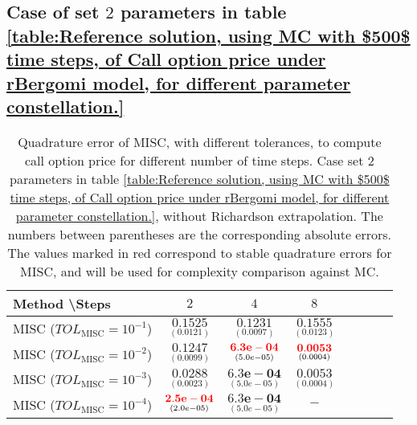 \subsection{Case of set $2$ parameters in table \ref{table:Reference solution, using MC with $500$ time steps, of Call option price under rBergomi model, for different parameter constellation.} }
\label{appendix:Case of set $2$ parameters_linear}



\begin{table}[h!]
	\centering
	\begin{tabular}{l*{6}{c}r}
		Method \textbackslash  Steps            & $2$ & $4$ & $8$ \\
		\hline
		MISC ($TOL_{\text{MISC}}=10^{-1}$)  & $\underset{(     0.0121)}{\mathbf{
				0.1525}}$ & $\underset{(    0.0097)}{\mathbf{      0.1231
		}}$ & $\underset{( 0.0123
			
			)}{\mathbf{    0.1555}}$   \\
		MISC ($TOL_{\text{MISC}}=10^{-2}$)  & $\underset{(    0.0099
			)}{\mathbf{     0.1247
		}}$ & $\underset{(   5.0e-05)}{\mathbf{\red{  6.3e-04}
		}}$ & $\underset{(0.0004)}{\mathbf{\red{0.0053}}}$  \\
		MISC ($TOL_{\text{MISC}}=10^{-3}$)        & $\underset{(    
			0.0023)}{\mathbf{0.0288}}$  &$\underset{(   5.0e-05)}{\mathbf{  6.3e-04
		}}$ & $\underset{(0.0004)}{\mathbf{0.0053}}$  \\
		MISC ($TOL_{\text{MISC}}=10^{-4}$)        & $\underset{(2.0e-05)}{\mathbf{  \red{ 2.5e-04}}} $ &$\underset{(   5.0e-05)}{\mathbf{ 6.3e-04
		}}$ &  $-$ \\	
		
		\hline
	\end{tabular}
	\caption{Quadrature error of MISC, with different tolerances, to compute call option price  for different number of time steps. Case  set $2$ parameters in table \ref{table:Reference solution, using MC with $500$ time steps, of Call option price under rBergomi model, for different parameter constellation.}, without Richardson extrapolation. The numbers between parentheses are the corresponding absolute errors. The values marked in red correspond to stable quadrature errors for MISC, and will be used for complexity comparison against MC.}
	\label{Quadrature error of MISC to compute Call option price of the different tolerances for different number of time steps. Case  set $2$ parameters, without Richardson extrapolation. The numbers between parentheses are the corresponding absolute errors,linear}
\end{table}


